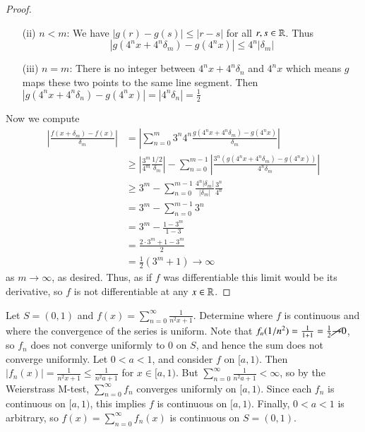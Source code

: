 \begin{proof}
\begin{itemize}
        \item[(ii)] $n < m$: We have $|g(r) - g(s)| \leq |r-s|$ for all $r,s \in \mathbb R$. Thus $$|g(4^nx+4^n\delta_m) - g(4^nx)| \leq 4^n|\delta_m|$$
        \item[(iii)] $n=m$: There is no integer between $4^nx+4^n\delta_n$ and $4^nx$ which means $g$ maps these two points to the same line segment. Then $|g(4^nx+4^n\delta_n) - g(4^nx)| = |4^n\delta_n| = \frac{1}{2}$
    \end{itemize}
    Now we compute \begin{align*}
        \left|\frac{f(x+\delta_m)-f(x)}{\delta_m}\right| &= \left|\sum_{n=0}^m{3^n}{4^n}\frac{g(4^nx+4^n\delta_m) - g(4^nx)}{\delta_m}\right| \\
        &\geq \left|\frac{3^m}{4^m}\frac{1/2}{\delta_m}\right| -\sum_{n=0}^{m-1}\left|\frac{3^n(g(4^nx+4^n\delta_m) - g(4^nx))}{4^n\delta_m}\right| \\
        &\geq 3^m - \sum_{n=0}^{m-1}\frac{4^n|\delta_m|}{|\delta_m|}\frac{3^n}{4^n} \\
        &= 3^m - \sum_{n=0}^{m-1}3^n \\
        &= 3^m - \frac{1-3^m}{1-3} \\
        &= \frac{2\cdot3^m+1-3^m}{2} \\
        &= \frac{1}{2}(3^m+1)\rightarrow \infty
    \end{align*}
    as $m\rightarrow \infty$, as desired. Thus, as if $f$ was differentiable this limit would be its derivative, so $f$ is not differentiable at any $x \in \mathbb R$.
\end{proof}

\begin{example}
    Let $S = (0,1)$ and $f(x) = \sum_{n=0}^{\infty}\frac{1}{n^2x+1}$. Determine where $f$ is continuous and where the convergence of the series is uniform. Note that $f_n(1/n^2) = \frac{1}{1+1} = \frac{1}{2}\cancel{\rightarrow} 0$, so $f_n$ does not converge uniformly to $0$ on $S$, and hence the sum does not converge uniformly. Let $0 < a < 1$, and consider $f$ on $[a,1)$. Then $|f_n(x)| = \frac{1}{n^2x+1} \leq \frac{1}{n^2a+1}$ for $x \in [a,1)$. But $\sum_{n=0}^{\infty}\frac{1}{n^2a+1} < \infty$, so by the Weierstrass M-test, $\sum_{n=0}^{\infty}f_n$ converges uniformly on $[a,1)$. Since each $f_n$ is continuous on $[a,1)$, this implies $f$ is continuous on $[a,1)$. Finally, $0 < a < 1$ is arbitrary, so $f(x) = \sum_{n=0}^{\infty}f_n(x)$ is continuous on $S = (0,1)$.
\end{example}


